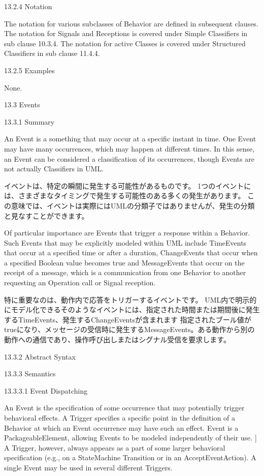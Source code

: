 \documentclass[a4paper,11pt]{ltjsarticle}
\begin{document}
13.2.4 Notation

The notation for various subclasses of Behavior are defined in subsequent clauses.
The notation for Signals and Receptions is covered under Simple Classifiers in sub clause 10.3.4.
The notation for active Classes is covered under Structured Classifiers in sub clause 11.4.4.

13.2.5 Examples

None.

\clearpage

13.3 Events

13.3.1 Summary

An Event is a something that may occur at a specific instant in time. 
One Event may have many occurrences, which may happen at different times. 
In this sense, an Event can be considered a classification of its occurrences, though Events are not actually Classifiers in UML.

イベントは、特定の瞬間に発生する可能性があるものです。
1つのイベントには、さまざまなタイミングで発生する可能性のある多くの発生があります。
この意味では、イベントは実際にはUMLの分類子ではありませんが、発生の分類と見なすことができます。

Of particular importance are Events that trigger a response within a Behavior. 
Such Events that may be explicitly modeled within UML include TimeEvents that occur at a specified time or after a duration, ChangeEvents that occur
when a specified Boolean value becomes true and MessageEvents that occur on the receipt of a message, which is a communication from one Behavior to another requesting an Operation call or Signal reception.

特に重要なのは、動作内で応答をトリガーするイベントです。
UML内で明示的にモデル化できるそのようなイベントには、指定された時間または期間後に発生するTimeEvents、発生するChangeEventsが含まれます
指定されたブール値がtrueになり、メッセージの受信時に発生するMessageEvents。ある動作から別の動作への通信であり、操作呼び出しまたはシグナル受信を要求します。

13.3.2 Abstract Syntax

13.3.3 Semantics

13.3.3.1 Event Dispatching

An Event is the specification of some occurrence that may potentially trigger behavioral effects. 
A Trigger specifies a specific point in the definition of a Behavior at which an Event occurrence may have such an effect. 
Event is a PackageableElement, allowing Events to be modeled independently of their use. ]
A Trigger, however, always appears as a part of some larger behavioral specification (e.g., on a StateMachine Transition or in an AcceptEventAction). 
A single Event may be used in several different Triggers.
\end{document}
